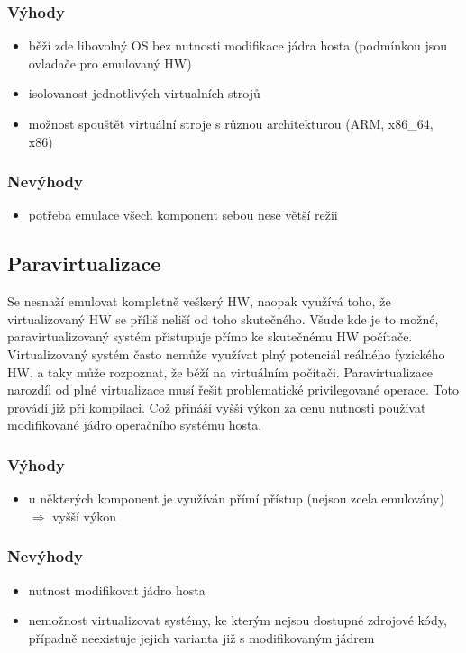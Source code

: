 \subsubsection*{Výhody}
\begin{itemize}
  \item běží zde libovolný OS bez nutnosti modifikace jádra hosta (podmínkou jsou ovladače pro emulovaný HW)
  \item isolovanost jednotlivých virtualních strojů
  \item možnost spouštět virtuální stroje s různou architekturou (ARM, x86\_64, x86)
\end{itemize}
\subsubsection*{Nevýhody}
\begin{itemize}
  \item potřeba emulace všech komponent sebou nese větší režii
\end{itemize}
\subsection{Paravirtualizace}
Se nesnaží emulovat kompletně veškerý HW, naopak využívá toho, že virtualizovaný HW se příliš neliší od toho skutečného. Všude kde je to možné, paravirtualizovaný systém přistupuje přímo ke skutečnému HW počítače. Virtualizovaný systém často nemůže využívat plný potenciál reálného fyzického HW, a taky může rozpoznat, že běží na virtuálním počítači. Paravirtualizace narozdíl od plné virtualizace musí řešit problematické privilegované operace. Toto provádí již při kompilaci. Což přináší vyšší výkon za cenu nutnosti používat modifikované jádro operačního systému hosta.
\subsubsection*{Výhody}
\begin{itemize}
  \item u některých komponent je využíván přímí přístup (nejsou zcela emulovány) $\Rightarrow$ vyšší výkon
\end{itemize}
\subsubsection*{Nevýhody}
\begin{itemize}
  \item nutnost modifikovat jádro hosta
  \item nemožnost virtualizovat systémy, ke kterým nejsou dostupné zdrojové kódy, případně neexistuje jejich varianta již s modifikovaným jádrem
\end{itemize}

